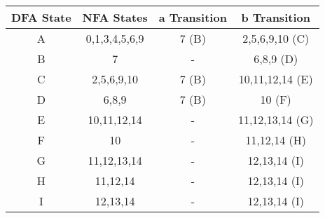 \documentclass{article}
\begin{document}
\begin{enumerate}
    \begin{center}
    \begin{tabular}{c|c|c|c}
        \textbf{DFA State} & \textbf{NFA States} & \textbf{a Transition} & \textbf{b Transition}\\
        \hline\hline
        A & 0,1,3,4,5,6,9 & 7 (B) & 2,5,6,9,10 (C)  \\
        B & 7             & -     & 6,8,9 (D)       \\
        C & 2,5,6,9,10    & 7 (B) & 10,11,12,14 (E) \\
        D & 6,8,9         & 7 (B) & 10 (F)          \\
        E & 10,11,12,14   & -     & 11,12,13,14 (G) \\
        F & 10            & -     & 11,12,14 (H)    \\
        G & 11,12,13,14   & -     & 12,13,14 (I)    \\
        H & 11,12,14      & -     & 12,13,14 (I)    \\
        I & 12,13,14      & -     & 12,13,14 (I)    \\
    \end{tabular}
    \end{center}

\end{enumerate}
\end{document}
